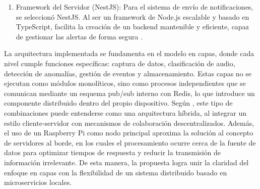 \begin{enumerate}
      \item Framework del Servidor (NestJS): Para el sistema de envío de notificaciones, se seleccionó NestJS. Al ser un framework de Node.js escalable y basado en TypeScript, facilita la creación de un backend mantenible y eficiente, capaz de gestionar las alertas de forma segura \cite{sabo_nestjs_2020}.
\end{enumerate}



La arquitectura implementada se fundamenta en el modelo en capas, donde cada nivel cumple funciones específicas: captura de datos, clasificación de audio, detección de anomalías, gestión de eventos y almacenamiento. Estas capas no se ejecutan como módulos monolíticos, sino como procesos independientes que se comunican mediante un esquema pub/sub interno con Redis, lo que introduce un componente distribuido dentro del propio dispositivo. Según \citeauthor{tanenbaum2007distributed} \citeyear{tanenbaum2007distributed}, este tipo de combinaciones puede entenderse como una arquitectura híbrida, al integrar un estilo cliente-servidor con mecanismos de colaboración descentralizados. Además, el uso de un Raspberry Pi como nodo principal aproxima la solución al concepto de servidores al borde, en los cuales el procesamiento ocurre cerca de la fuente de datos para optimizar tiempos de respuesta y reducir la transmisión de información irrelevante. De esta manera, la propuesta logra unir la claridad del enfoque en capas con la flexibilidad de un sistema distribuido basado en microservicios locales.

